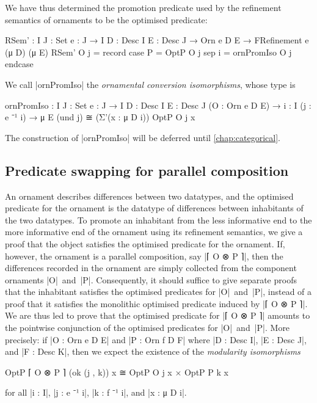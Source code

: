 We have thus determined the promotion predicate used by the refinement semantics of ornaments to be the optimised predicate:
\begin{code}
RSem' :  {I J : Set} {e : J → I} {D : Desc I} {E : Desc J} →
         Orn e D E → FRefinement e (μ D) (μ E)
RSem' O j = record  case  P  = OptP O j
                    sep   i  = ornPromIso O j endcase
\end{code}
We call |ornPromIso| the \emph{ornamental conversion isomorphisms}, whose type is
\begin{code}
ornPromIso :
  {I J : Set} {e : J → I} {D : Desc I} {E : Desc J} (O : Orn e D E) →
  {i : I} (j : e ⁻¹ i) → μ E (und j) ≅ (Σ'(x : μ D i)) OptP O j x
\end{code}
The construction of |ornPromIso| will be deferred until \autoref{chap:categorical}.

\subsection{Predicate swapping for parallel composition}

An ornament describes differences between two datatypes, and the optimised predicate for the ornament is the datatype of differences between inhabitants of the two datatypes.
To promote an inhabitant from the less informative end to the more informative end of the ornament using its refinement semantics, we give a proof that the object satisfies the optimised predicate for the ornament.
If, however, the ornament is a parallel composition, say |⌈ O ⊗ P ⌉|, then the differences recorded in the ornament are simply collected from the component ornaments |O|~and~|P|.
Consequently, it should suffice to give separate proofs that the inhabitant satisfies the optimised predicates for |O|~and~|P|, instead of a proof that it satisfies the monolithic optimised predicate induced by |⌈ O ⊗ P ⌉|.
We are thus led to prove that the optimised predicate for |⌈ O ⊗ P ⌉| amounts to the pointwise conjunction of the optimised predicates for |O|~and~|P|.
More precisely: if |O : Orn e D E| and |P : Orn f D F| where |D : Desc I|, |E : Desc J|, and |F : Desc K|, then we expect the existence of the \emph{modularity isomorphisms}
\begin{code}
OptP ⌈ O ⊗ P ⌉ (ok (j , k)) x ≅ OptP O j x × OptP P k x
\end{code}
for all |i : I|, |j : e ⁻¹ i|, |k : f ⁻¹ i|, and |x : μ D i|.

